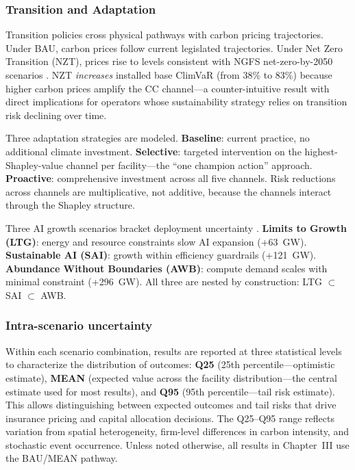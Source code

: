 \begin{twocolbody}

\subsubsection*{Transition and Adaptation}

Transition policies cross physical pathways with carbon pricing trajectories. Under BAU, carbon prices follow current legislated trajectories. Under Net Zero Transition (NZT), prices rise to levels consistent with NGFS net-zero-by-2050 scenarios \citep{ngfs2023}. NZT \textit{increases} installed base ClimVaR (from 38\% to 83\%) because higher carbon prices amplify the CC channel---a counter-intuitive result with direct implications for operators whose sustainability strategy relies on transition risk declining over time.

Three adaptation strategies are modeled. \textbf{Baseline}: current practice, no additional climate investment. \textbf{Selective}: targeted intervention on the highest-Shapley-value channel per facility---the ``one champion action'' approach. \textbf{Proactive}: comprehensive investment across all five channels. Risk reductions across channels are multiplicative, not additive, because the channels interact through the Shapley structure.

Three AI growth scenarios bracket deployment uncertainty \citep{paccou2024}. \textbf{Limits to Growth (LTG)}: energy and resource constraints slow AI expansion (+63~GW). \textbf{Sustainable AI (SAI)}: growth within efficiency guardrails (+121~GW). \textbf{Abundance Without Boundaries (AWB)}: compute demand scales with minimal constraint (+296~GW). All three are nested by construction: LTG $\subset$ SAI $\subset$ AWB.

\subsubsection*{Intra-scenario uncertainty}

Within each scenario combination, results are reported at three statistical levels to characterize the distribution of outcomes: \textbf{Q25} (25th percentile---optimistic estimate), \textbf{MEAN} (expected value across the facility distribution---the central estimate used for most results), and \textbf{Q95} (95th percentile---tail risk estimate). This allows distinguishing between expected outcomes and tail risks that drive insurance pricing and capital allocation decisions. The Q25--Q95 range reflects variation from spatial heterogeneity, firm-level differences in carbon intensity, and stochastic event occurrence. Unless noted otherwise, all results in Chapter~III use the BAU/MEAN pathway.

\end{twocolbody}